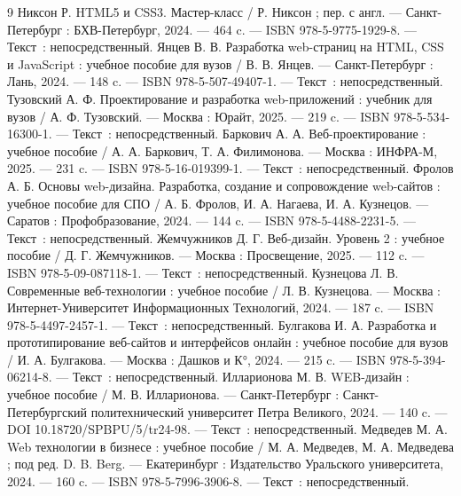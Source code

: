 \begin{thebibliography}{9}
     Никсон Р. HTML5 и CSS3. Мастер-класс / Р. Никсон ; пер. с англ. — Санкт-Петербург : БХВ-Петербург, 2024. — 464 c. — ISBN 978-5-9775-1929-8. — Текст~: непосредственный.
     Янцев В. В. Разработка web-страниц на HTML, CSS и JavaScript : учебное пособие для вузов / В. В. Янцев. — Санкт-Петербург : Лань, 2024. — 148 c. — ISBN 978-5-507-49407-1. — Текст~: непосредственный.
     Тузовский А. Ф. Проектирование и разработка web-приложений : учебник для вузов / А. Ф. Тузовский. — Москва : Юрайт, 2025. — 219 c. — ISBN 978-5-534-16300-1. — Текст~: непосредственный.
     Баркович А. А. Веб-проектирование : учебное пособие / А. А. Баркович, Т. А. Филимонова. — Москва : ИНФРА-М, 2025. — 231 c. — ISBN 978-5-16-019399-1. — Текст~: непосредственный.
     Фролов А. Б. Основы web-дизайна. Разработка, создание и сопровождение web-сайтов : учебное пособие для СПО / А. Б. Фролов, И. А. Нагаева, И. А. Кузнецов. — Саратов : Профобразование, 2024. — 144 c. — ISBN 978-5-4488-2231-5. — Текст~: непосредственный.
     Жемчужников Д. Г. Веб-дизайн. Уровень 2 : учебное пособие / Д. Г. Жемчужников. — Москва : Просвещение, 2025. — 112 c. — ISBN 978-5-09-087118-1. — Текст~: непосредственный.
     Кузнецова Л. В. Современные веб-технологии : учебное пособие / Л. В. Кузнецова. — Москва : Интернет-Университет Информационных Технологий, 2024. — 187 c. — ISBN 978-5-4497-2457-1. — Текст~: непосредственный.
     Булгакова И. А. Разработка и прототипирование веб-сайтов и интерфейсов онлайн : учебное пособие для вузов / И. А. Булгакова. — Москва : Дашков и К°, 2024. — 215 c. — ISBN 978-5-394-06214-8. — Текст~: непосредственный.
     Илларионова М. В. WEB-дизайн : учебное пособие / М. В. Илларионова. — Санкт-Петербург : Санкт-Петербургский политехнический университет Петра Великого, 2024. — 140 c. — DOI 10.18720/SPBPU/5/tr24-98. — Текст~: непосредственный.
     Медведев М. А. Web технологии в бизнесе : учебное пособие / М. А. Медведев, М. А. Медведева ; под ред. D. B. Berg. — Екатеринбург : Издательство Уральского университета, 2024. — 160 c. — ISBN 978-5-7996-3906-8. — Текст~: непосредственный. 
\end{thebibliography}
